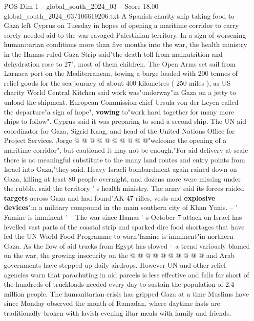 \begin{textsample}{POS Dim 1 – global\_south\_2024\_03 – Score 18.00 – global\_south\_2024\_03/106619206.txt}  \label{ex:f1_pos_341}
A Spanish charity ship taking food to Gaza left Cyprus on Tuesday in hopes of opening a maritime corridor to carry sorely needed aid to the war-ravaged Palestinian territory.
In a sign of worsening humanitarian conditions more than five months into the war, the health ministry in the Hamas-ruled Gaza Strip said"the death toll from malnutrition and dehydration rose to 27", most of them children.
The Open Arms set sail from Larnaca port on the Mediterranean, towing a barge loaded with 200 tonnes of relief goods for the sea journey of about 400 kilometres ( 250 miles ), as US charity World Central Kitchen said work was"underway"in Gaza on a jetty to unload the shipment.
European Commission chief Ursula von der Leyen called the departure"a sign of hope", \textbf{vowing} to"work hard together for many more ships to follow".
Cyprus said it was preparing to send a second ship.
The UN aid coordinator for Gaza, Sigrid Kaag, and head of the United Nations Office for Project Services, Jorge @ @ @ @ @ @ @ @ @ @"welcome the opening of a maritime corridor", but cautioned it may not be enough."For aid delivery at scale there is no meaningful substitute to the many land routes and entry points from Israel into Gaza,"they said.
Heavy Israeli bombardment again rained down on Gaza, killing at least 80 people overnight, and dozens more were missing under the rubble, said the territory ' s health ministry.
The army said its forces raided \textbf{targets} across Gaza and had found"AK-47 rifles, vests and \textbf{explosive} \textbf{devices}"in a military compound in the main southern city of Khan Yunis. -- ' Famine is imminent ' -- The war since Hamas ' s October 7 attack on Israel has levelled vast parts of the coastal strip and sparked dire food shortages that have led the UN World Food Programme to warn"famine is imminent"in northern Gaza.
As the flow of aid trucks from Egypt has slowed -- a trend variously blamed on the war, the growing insecurity on the @ @ @ @ @ @ @ @ @ @ and Arab governments have stepped up daily airdrops.
However UN and other relief agencies warn that parachuting in aid parcels is less effective and falls far short of the hundreds of truckloads needed every day to sustain the population of 2.4 million people.
The humanitarian crisis has gripped Gaza at a time Muslims have since Monday observed the month of Ramadan, where daytime fasts are traditionally broken with lavish evening iftar meals with family and friends.

\end{textsample}
